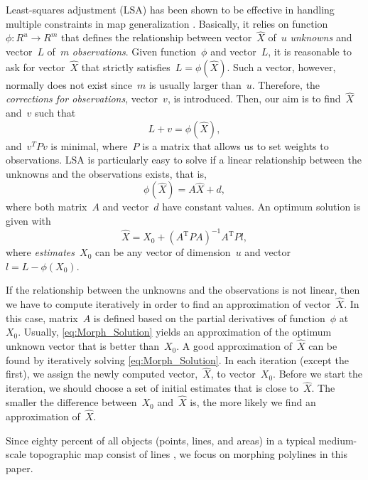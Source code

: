 Least-squares adjustment (LSA) has been shown to be effective 
in handling multiple constraints in map generalization
\parencite{Sester2000,Harrie2002}. 
Basically, it relies on 
function~$\phi: R^u \rightarrow R^m$ 
that defines the relationship between
vector~$\hat{X}$ of~$u$ \emph{unknowns} and 
vector~$L$ of~$m$ \emph{observations}. 
Given function~$\phi$ and vector~$L$, 
it is reasonable to ask for 
vector~$\hat{X}$ that strictly satisfies~$L=\phi(\hat{X})$. 
Such a vector, however, 
normally does not exist since~$m$ is usually larger than~$u$. 
Therefore, the \emph{corrections for observations}, 
vector~$v$, is introduced. 
Then, our aim is to find~$\hat{X}$ and~$v$ such that
\begin{equation}
L+v= \phi(\hat{X}), \nonumber
\end{equation}
and~$v^T P v$ is minimal, 
where~$P$ is a matrix 
that allows us to set weights to observations.
LSA is particularly easy to solve 
if a linear relationship between the unknowns 
and the observations exists, that is,
\begin{equation}
\label{eq:Morph_Relationship}
\phi(\hat{X})=A\hat{X}+d,
\end{equation}
where both matrix~$A$ and vector~$d$ have constant values. 
An optimum solution is given with
\begin{equation}
\label{eq:Morph_Solution}
\hat{X}=X_0+ (A^\mathrm{T}PA)^{-1}A^\mathrm{T}Pl,
\end{equation}
where \emph{estimates}~$X_0$ can be 
any vector of dimension~$u$ and vector~$l=L- \phi(X_0)$.

If the relationship 
between the unknowns and the observations is not linear,
then we have to compute iteratively 
in order to find an approximation of vector~$\hat{X}$. 
In this case, matrix~$A$ is defined based on 
the partial derivatives of function~$\phi$ at~$X_0$.
Usually, \eq\ref{eq:Morph_Solution} yields 
an approximation of the optimum 
unknown vector that is better than~$X_0$. 
A good approximation of~$\hat{X}$ can be 
found by iteratively solving \eq\ref{eq:Morph_Solution}. 
In each iteration (except the first),
we assign the newly computed vector,~$\hat{X}$, 
to vector~$X_0$.
Before we start the iteration, we should choose
a set of initial estimates that is close to~$\hat{X}$. 
The smaller the difference between~$X_0$ and~$\hat{X}$ is,
the more likely we find an approximation of~$\hat{X}$.

Since eighty percent of all objects (points, lines, and areas) 
in a typical medium-scale topographic map consist of lines
\parencite{Muller1991}, 
we focus on morphing polylines in this paper.


